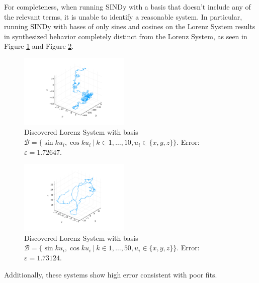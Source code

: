 \documentclass[10pt]{paper}
\begin{document}
For completeness, when running SINDy with a basis that doesn't include any of the relevant terms, it is unable to identify a reasonable system. In particular, running SINDy with bases of only sines and cosines on the Lorenz System results in synthesized behavior completely distinct from the Lorenz System, 
as seen in Figure \ref{fig:found_lorenz_ex_7} and Figure \ref{fig:found_lorenz_ex_8}.
\begin{figure}[H]
	\caption{Discovered Lorenz System with basis $\mathcal B = \{ \sin{ku_i}, \cos{ku_i} \ | \ k \in 1, \ldots, 10, u_i \in \{x,y,z\} \}$. Error: $\varepsilon = 1.72647$.}
	\label{fig:found_lorenz_ex_7}

	\centering 
	\includegraphics[width = 0.47\textwidth, trim={4.3cm, 1.6cm, 4.3cm, 2.5cm}, clip]{lorenz_7_sol.pdf}

\end{figure}
\begin{figure}[H]
	\caption{Discovered Lorenz System with basis $\mathcal B = \{ \sin{ku_i}, \cos{ku_i} \ | \ k \in 1, \ldots, 50, u_i \in \{x,y,z\} \}$. Error: $\varepsilon = 1.73124$.}
	\label{fig:found_lorenz_ex_8}

	\centering 
	\includegraphics[width = 0.47\textwidth, trim={4.3cm, 1.6cm, 4.3cm, 2.5cm}, clip]{lorenz_8_sol.pdf}

\end{figure}

Additionally, these systems show high error consistent with poor fits. 

\newpage
\printbibliography
\end{document}
